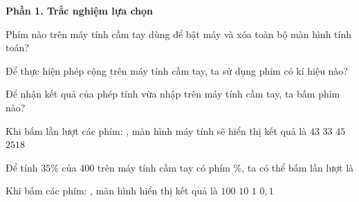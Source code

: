 \textbf{Phần 1. Trắc nghiệm lựa chọn}

\begin{ex} %
Phím nào trên máy tính cầm tay dùng để bật máy và xóa toàn bộ màn hình tính toán?
\choice
{}
{}
{\fbox{=}}
{\True {}}
\end{ex}

\begin{ex} %
Để thực hiện phép cộng trên máy tính cầm tay, ta sử dụng phím có kí hiệu nào?
\choice
{\fbox{--}}
{\fbox{$\times$}}
{\True \fbox{+}}
{\fbox{$\div$}}
\end{ex}

\begin{ex} %
Để nhận kết quả của phép tính vừa nhập trên máy tính cầm tay, ta bấm phím nào?
\choice
{}
{\True \fbox{=}}
{\fbox{\%}}
{}
\end{ex}

\begin{ex} %
Khi bấm lần lượt các phím:   \fbox{+}   \fbox{=}, màn hình máy tính sẽ hiển thị kết quả là
\choice
{\True $43$}
{$33$}
{$45$}
{$2518$}
\end{ex}

\begin{ex} %
Để tính $35\%$ của $400$ trên máy tính cầm tay có phím \%, ta có thể bấm lần lượt là
\choice
{   \fbox{+}   \fbox{\%}}
{   \fbox{$\div$}   \fbox{\%}}
{\True {}   \fbox{$\times$}   \fbox{\%}}
{  \fbox{+}    \fbox{=}}
\end{ex}

\begin{ex} %
Khi bấm các phím:     \fbox{$\times$}  \fbox{=}, màn hình hiển thị kết quả là
\choice
{$100$}
{\True $10$}
{$1$}
{$0{,}1$}
\end{ex}

